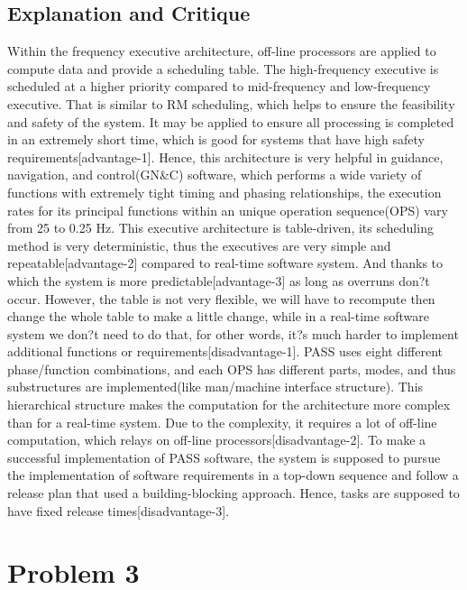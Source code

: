 \documentclass{article}
\begin{document}
\subsection*{Explanation and Critique}
Within the frequency executive architecture, off-line processors are applied to compute data and provide a scheduling table. The high-frequency executive is scheduled at a higher priority compared to mid-frequency and low-frequency executive. That is similar to RM scheduling, which helps to ensure the feasibility and safety of the system. It may be applied to ensure all processing is completed in an extremely short time, which is good for systems that have high safety requirements[advantage-1].
Hence, this architecture is very helpful in guidance, navigation, and control(GN\&C) software, which performs a wide variety of functions with extremely tight timing and phasing relationships, the execution rates for its principal functions within an unique operation sequence(OPS) vary from 25 to 0.25 Hz.
This executive architecture is table-driven, its scheduling method is very deterministic, thus the executives are very simple and repeatable[advantage-2] compared to real-time software system. And thanks to which the system is more predictable[advantage-3] as long as overruns don?t occur. However, the table is not very flexible, we will have to recompute then change the whole table to make a little change, while in a real-time software system we don?t need to do that, for other words, it?s much harder to implement additional functions or requirements[disadvantage-1].
PASS uses eight different phase/function combinations, and each OPS has  different parts, modes, and thus substructures are implemented(like man/machine interface structure). This hierarchical structure makes the computation for the architecture more complex than for a real-time system. Due to the complexity, it requires a lot of off-line computation, which relays on off-line processors[disadvantage-2].
To make a successful implementation of PASS software, the system is supposed to pursue the implementation of software requirements in a top-down sequence and follow a release plan that used a building-blocking approach. Hence, tasks are supposed to have fixed release times[disadvantage-3].

\section*{Problem 3}
\end{document}

